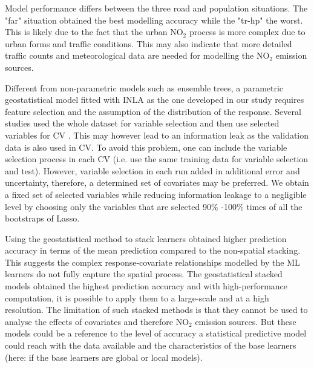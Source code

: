 \documentclass{article}
\begin{document}
Model performance differs between the three road and population situations. The "far" situation obtained the best modelling accuracy while the "tr-hp" the worst. This is likely due to the fact that the urban NO$_2$ process is more complex due to urban forms and traffic conditions. This may also indicate that more detailed traffic counts and meteorological data are needed for modelling the NO$_2$ emission sources.  

Different from non-parametric models such as ensemble trees, a parametric geostatistical model fitted with INLA as the one developed in our study requires feature selection and the assumption of the distribution of the response. Several studies used the whole dataset for variable selection and then use selected variables for CV \citep{lu2020land,larkin2017global}. This may however lead to an information leak as the validation data is also used in CV. To avoid this problem, one can include the variable selection process in each CV (i.e. use the same training data for variable selection and test). However, variable selection in each run added in additional error and uncertainty, therefore, a determined set of covariates may be preferred. We obtain a fixed set of selected variables while reducing information leakage to a negligible level by choosing only the variables that are selected 90\% -100\% times of all the bootstraps of Lasso.

Using the geostatistical method to stack learners obtained higher prediction accuracy in terms of the mean prediction compared to the non-spatial stacking. This suggests the complex response-covariate relationships modelled by the ML learners do not fully capture the spatial process. The geostatistical stacked models obtained the highest prediction accuracy and with high-performance computation, it is possible to apply them to a large-scale and at a high resolution. The limitation of such stacked methods is that they cannot be used to analyse the effects of covariates and therefore NO$_2$ emission sources. But these models could be a reference to the level of accuracy a statistical predictive model could reach with the data available and the characteristics of the base learners (here: if the base learners are global or local models).
\end{document}
